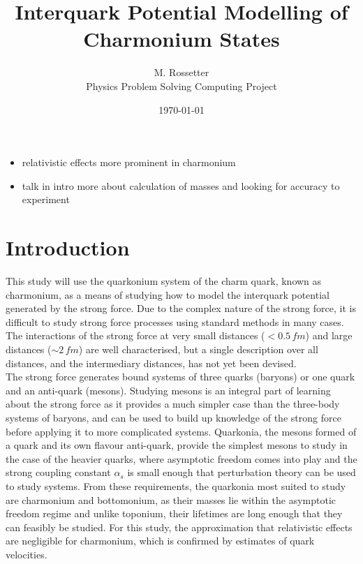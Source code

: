 \documentclass[10pt, twocolumn]{article}
\title{Interquark Potential Modelling of Charmonium States}
\author{M. Rossetter \\ Physics Problem Solving Computing Project}
\date{\vspace{-0.30cm} \today}
\begin{document}
\thispagestyle{plain}

\begin{itemize}
    \item relativistic effects more prominent in charmonium
    \item talk in intro more about calculation of masses and looking for accuracy to experiment
\end{itemize}
\section{Introduction}
This study will use the quarkonium system of the charm quark, known as charmonium, as a means of studying how to model the interquark potential generated by the strong force.
Due to the complex nature of the strong force, it is difficult to study strong force processes using standard methods in many cases. 
The interactions of the strong force at very small distances ($<0.5\,fm$) and large distances ($\sim2\,fm$) are well characterised, but a single description over all distances, and the intermediary distances, has not yet been devised. \\
The strong force generates bound systems of three quarks (baryons) or one quark and an anti-quark (mesons). 
Studying mesons is an integral part of learning about the strong force as it provides a much simpler case than the three-body systems of baryons, and can be used to build up knowledge of the strong force before applying it to more complicated systems. 
Quarkonia, the mesons formed of a quark and its own flavour anti-quark, provide the simplest mesons to study in the case of the heavier quarks, where asymptotic freedom comes into play and the strong coupling constant $\alpha_s$ is small enough that perturbation theory can be used to study systems.
From these requirements, the quarkonia most suited to study are charmonium and bottomonium, as their masses lie within the asymptotic freedom regime and unlike toponium, their lifetimes are long enough that they can feasibly be studied.
For this study, the approximation that relativistic effects are negligible for charmonium, which is confirmed by estimates of quark velocities. 
\end{document}

